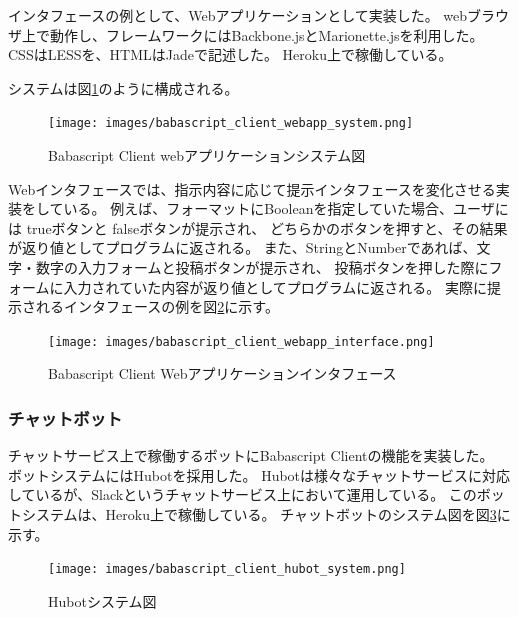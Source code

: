 インタフェースの例として、Webアプリケーションとして実装した。
webブラウザ上で動作し、フレームワークにはBackbone.jsとMarionette.jsを利用した。
CSSはLESSを、HTMLはJadeで記述した。 Heroku上で稼働している。

システムは図\ref{fig:babascript_client_webapp_system}のように構成される。

\begin{figure}[htbp]
  \begin{center}
  \texttt{[image: images/babascript\_client\_webapp\_system.png]}
  \end{center}
  \caption{Babascript Client webアプリケーションシステム図}
  \label{fig:babascript_client_webapp_system}
\end{figure}

Webインタフェースでは、指示内容に応じて提示インタフェースを変化させる実装をしている。
例えば、フォーマットにBooleanを指定していた場合、ユーザには trueボタンと
falseボタンが提示され、
どちらかのボタンを押すと、その結果が返り値としてプログラムに返される。
また、StringとNumberであれば、文字・数字の入力フォームと投稿ボタンが提示され、
投稿ボタンを押した際にフォームに入力されていた内容が返り値としてプログラムに返される。
実際に提示されるインタフェースの例を図\ref{fig:babascript_client_webapp_interface}に示す。

\begin{figure}[htbp]
  \begin{center}
  \texttt{[image: images/babascript\_client\_webapp\_interface.png]}
  \end{center}
  \caption{Babascript Client Webアプリケーションインタフェース}
  \label{fig:babascript_client_webapp_interface}
\end{figure}

\subsubsection{チャットボット}\label{ux30c1ux30e3ux30c3ux30c8ux30dcux30c3ux30c8}

チャットサービス上で稼働するボットにBabascript Clientの機能を実装した。
ボットシステムにはHubotを採用した。
Hubotは様々なチャットサービスに対応しているが、Slackというチャットサービス上において運用している。
このボットシステムは、Heroku上で稼働している。
チャットボットのシステム図を図\ref{fig:babascript_client_hubot_system}に示す。

\begin{figure}[htbp]
  \begin{center}
  \texttt{[image: images/babascript\_client\_hubot\_system.png]}
  \end{center}
  \caption{Hubotシステム図}
  \label{fig:babascript_client_hubot_system}
\end{figure}

